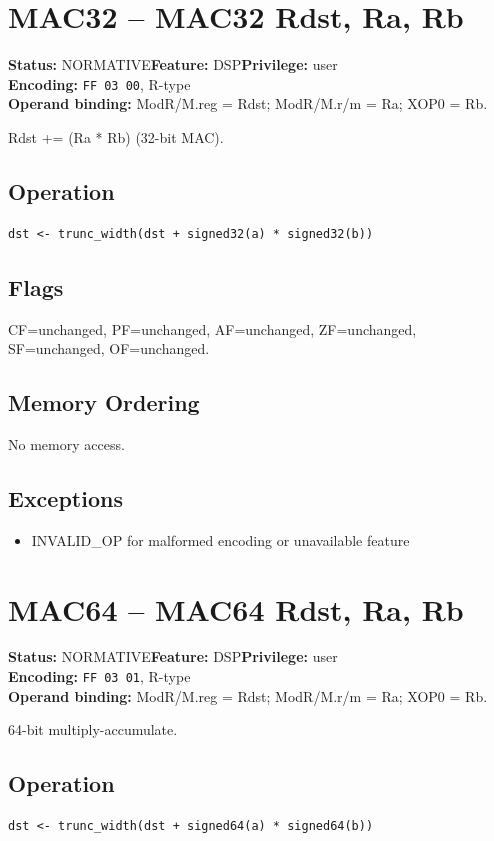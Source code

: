 \documentclass[10pt]{article}
\begin{document}
\section{MAC32 -- MAC32 Rdst, Ra, Rb}
\textbf{Status:} NORMATIVE\quad \textbf{Feature:} DSP\quad \textbf{Privilege:} user\\
\textbf{Encoding:} \texttt{FF 03 00}, R-type\\
\textbf{Operand binding:} ModR/M.reg = Rdst; ModR/M.r/m = Ra; XOP0 = Rb.

Rdst += (Ra * Rb) (32-bit MAC).

\subsection*{Operation}
\begin{lstlisting}
dst <- trunc_width(dst + signed32(a) * signed32(b))
\end{lstlisting}
\subsection*{Flags}
CF=unchanged, PF=unchanged, AF=unchanged, ZF=unchanged, SF=unchanged, OF=unchanged.
\subsection*{Memory Ordering}
No memory access.
\subsection*{Exceptions}
\begin{itemize}
\item INVALID\_OP for malformed encoding or unavailable feature
\end{itemize}
\clearpage

\section{MAC64 -- MAC64 Rdst, Ra, Rb}
\textbf{Status:} NORMATIVE\quad \textbf{Feature:} DSP\quad \textbf{Privilege:} user\\
\textbf{Encoding:} \texttt{FF 03 01}, R-type\\
\textbf{Operand binding:} ModR/M.reg = Rdst; ModR/M.r/m = Ra; XOP0 = Rb.

64-bit multiply-accumulate.

\subsection*{Operation}
\begin{lstlisting}
dst <- trunc_width(dst + signed64(a) * signed64(b))
\end{lstlisting}
\end{document}
